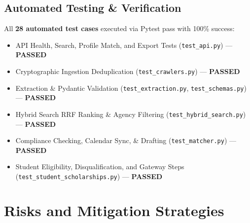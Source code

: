 \documentclass[12pt,a4paper]{article}
\begin{document}
\subsection{Automated Testing \& Verification}
All \textbf{28 automated test cases} executed via Pytest pass with 100\% success:
\begin{itemize}[itemsep=1pt]
    \item API Health, Search, Profile Match, and Export Tests (\texttt{test_api.py}) --- \textbf{PASSED}
    \item Cryptographic Ingestion Deduplication (\texttt{test_crawlers.py}) --- \textbf{PASSED}
    \item Extraction \& Pydantic Validation (\texttt{test_extraction.py}, \texttt{test_schemas.py}) --- \textbf{PASSED}
    \item Hybrid Search RRF Ranking \& Agency Filtering (\texttt{test_hybrid_search.py}) --- \textbf{PASSED}
    \item Compliance Checking, Calendar Sync, & Drafting (\texttt{test_matcher.py}) --- \textbf{PASSED}
    \item Student Eligibility, Disqualification, and Gateway Steps (\texttt{test_student_scholarships.py}) --- \textbf{PASSED}
\end{itemize}

\section{Risks and Mitigation Strategies}
\end{document}
